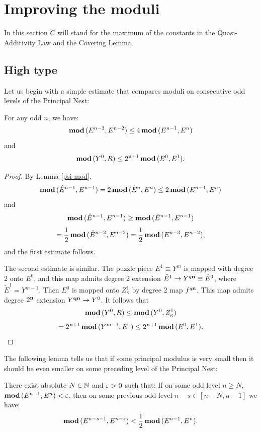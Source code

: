 
\section{Improving the moduli}\label{moduli}

In this section $C$ will stand for the maximum of the constants in the Quasi-Additivity Law and the Covering Lemma.

\subsection{High type}

Let us begin with a simple estimate that compares moduli on consecutive odd levels of the Principal Nest:

\begin{lem}\label{simple}
For any odd $n$, we have:
 $$  { \mathbf{mod}\, }(E^{n-3}, E^{n-2})\leq 4\, { \mathbf{mod}\, }(E^{n-1}, E^n) $$
and
  $$ { \mathbf{mod}\, }(Y^0, R) \leq 2^{{\mathbf{n}}+1}\, { \mathbf{mod}\, }(E^0, E^1).$$
\end{lem}

\begin{proof}
By Lemma \ref{psi-mod},
$$
   { \mathbf{mod}\, }(\hat E^{n-1}, E^{n-1}) = 2\, { \mathbf{mod}\, }(\tilde E^n, E^n) \leq 2\, { \mathbf{mod}\, }(E^{n-1}, E^n)
$$
and
$$
   { \mathbf{mod}\, }(\hat E^{n-1}, E^{n-1}) \geq { \mathbf{mod}\, }(\tilde E^{n-1}, E^{n-1} )
$$
$$
=\frac{1}{2}\, { \mathbf{mod}\, }(\hat E^{n-2}, E^{n-2})=
                                     \frac{1}{2}\,  { \mathbf{mod}\, }(E^{n-3}, E^{n-2}),
$$
and the first estimate follows.

The second estimate is similar. The puzzle piece $E^1\equiv Y^m$
is mapped with degree 2 onto $E^0$, and this map admits degree 2 extension
$\tilde E^1\rightarrow Y^{q{\mathbf{n}}}\equiv \hat E^0$, where $\tilde E^1 = Y^{m-1}$.
Then $E^0$ is mapped onto $Z^1_\kappa$ by degree 2 map $f^{q{\mathbf{n}}}$.
This map admits degree $2^{{\mathbf{n}}}$ extension $Y^{{\mathbf{q}}{\mathbf{n}}}\rightarrow Y^0$.
It follows that
$$
   { \mathbf{mod}\, }(Y^0, R)\leq { \mathbf{mod}\, }(Y^0, Z^1_\kappa)
$$
$$
  = 2^{{\mathbf{n}}+1}\,{ \mathbf{mod}\, }(Y^{m-1}, E^1)\leq 2^{{\mathbf{n}}+1}\, { \mathbf{mod}\, }(E^0, E^1).
$$
\end{proof}

The following  lemma tells us that if some principal  modulus is very small then it
should be even smaller on some preceding level of the Principal Nest:

\begin{lem}\label{growth-lem}
There exist absolute  $N\in {\Bbb N}$ and ${\varepsilon}>0$  such that:
If on some odd level $n\geq N$, $  { \mathbf{mod}\, }  (E^{n-1}, E^n ) <{\varepsilon} $,
then on some previous odd level $n-s\in [n-N, n-1]$ we have:
\begin{equation}\label{decrease}
    { \mathbf{mod}\, }  (E^{n-s-1},  E^{n-s} ) <  \frac{1}{2}\, { \mathbf{mod}\, }( E^{n-1},  E^n ).
\end{equation}
\end{lem}


